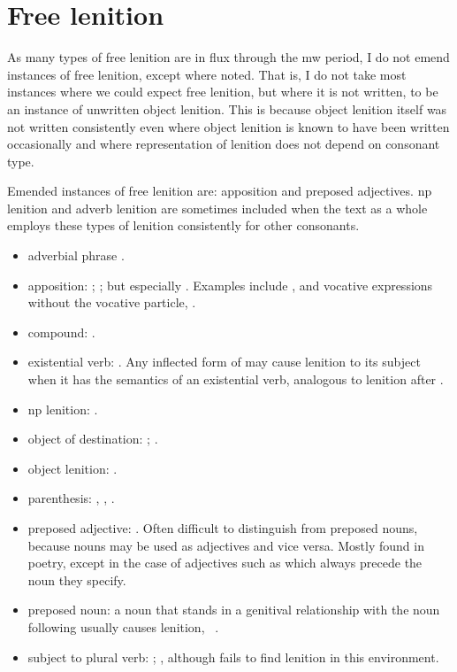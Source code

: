 \section{Free lenition}
\label{sec:free-lenition-1}
As many types of free lenition are in flux through the \gls{mw} period, I do not emend instances of free lenition, except where noted. That is, I do not take most instances where we could expect free lenition,  but where it is not written, to be an instance of \eg unwritten object lenition. This is because object lenition itself was not written consistently even where object lenition is known to have been written occasionally and where representation of lenition does not depend on consonant type.

Emended instances of free lenition are: apposition and preposed adjectives. \Gls{np} lenition and adverb lenition are sometimes included when the text as a whole employs these types of lenition consistently for other consonants.
\begin{itemize}
\item adverbial phrase \textcite[§~19, 22]{evans_grammar_1964}.
\item apposition: \textcite[§~19]{evans_grammar_1964}; \textcite[116--9, 122--3]{morgan_y_1952}; but especially \textcite{schrijver_free_2010}. Examples include , and vocative expressions without the vocative particle, \eg {}.
\item compound: \textcite[§~20, 22]{evans_grammar_1964}. 
\item existential verb:  \textcite[29--30]{van_development14}. Any inflected form of  may cause lenition to its subject when it has the semantics of an existential verb, analogous to lenition after .
\item \gls{np} lenition: \textcite[§~21]{evans_grammar_1964}.
\item object of destination: \textcite[227]{morgan_y_1952}; \textcite[§~21]{evans_grammar_1964}. 
\item object lenition: \textcite[§~21]{evans_grammar_1964}.
\item parenthesis: \textcite[429]{morgan_y_1952}, \textcite[§~21]{evans_grammar_1964}, \textcite[5--6]{schrijver_free_2010}.
\item preposed adjective: \textcite[35]{morgan_y_1952}. Often difficult to distinguish from preposed nouns, because nouns may be used as adjectives and vice versa. Mostly found in poetry, except in the case of adjectives such as  which always precede the noun  they specify.
\item preposed noun: a noun that stands in a genitival relationship with the noun following usually causes lenition, \eg {}~\autocite{daniel_cyfuniadau_2003}.
\item subject to plural verb: \textcite[§~21]{evans_grammar_1964}; \textcite[2]{schrijver_free_2010}, although \textcite{van_development14} fails to find lenition in this environment.
\end{itemize}



